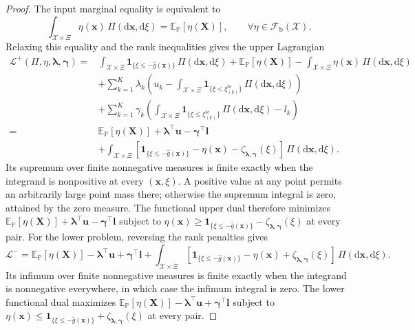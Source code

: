 \documentclass[review,11pt,3p,authoryear,nopreprintline]{elsarticle}
\begin{document}
\begin{proof}
  The input marginal equality is equivalent to
  \[
    \int_{\mathcal X\times\Xi}\eta(\bm x)\,\Pi(\mathrm d\bm x,\mathrm d\xi)
      =\mathbb E_{\mathbb P}\left[\eta(\bm X)\right],
    \qquad\forall\eta\in\mathcal F_{\mathrm b}(\mathcal X).
  \]
  Relaxing this equality and the rank inequalities gives the upper Lagrangian \citep[Section~5.1]{B.V04}
  \[
    \begin{aligned}
      \mathcal L^+(\Pi,\eta,\bm\lambda,\bm\gamma)
      ={}&\int_{\mathcal X\times\Xi}\mathbf1_{\{\xi\le-\hat g(\bm x)\}}\,\Pi(\mathrm d\bm x,\mathrm d\xi)
        +\mathbb E_{\mathbb P}\left[\eta(\bm X)\right]
        -\int_{\mathcal X\times\Xi}\eta(\bm x)\,\Pi(\mathrm d\bm x,\mathrm d\xi)\\
      &+\sum_{k=1}^{K}\lambda_k\left(u_k-\int_{\mathcal X\times\Xi}
          \mathbf1_{\{\xi<\xi_{(k)}^{\mathrm{te}}\}}\,\Pi(\mathrm d\bm x,\mathrm d\xi)\right)\\
      &+\sum_{k=1}^{K}\gamma_k\left(\int_{\mathcal X\times\Xi}
          \mathbf1_{\{\xi\le\xi_{(k)}^{\mathrm{te}}\}}\,\Pi(\mathrm d\bm x,\mathrm d\xi)-l_k\right)\\
      ={}&\mathbb E_{\mathbb P}\left[\eta(\bm X)\right]
        +\bm\lambda^\top\bm u-\bm\gamma^\top\bm l\\
      &+\int_{\mathcal X\times\Xi}\left[
          \mathbf1_{\{\xi\le-\hat g(\bm x)\}}-\eta(\bm x)-\zeta_{\bm\lambda,\bm\gamma}(\xi)
        \right]\,\Pi(\mathrm d\bm x,\mathrm d\xi).
    \end{aligned}
  \]
  Its supremum over finite nonnegative measures is finite exactly when the integrand is nonpositive at every $(\bm x,\xi)$. A positive value at any point permits an arbitrarily large point mass there; otherwise the supremum integral is zero, attained by the zero measure. The functional upper dual therefore minimizes $\mathbb E_{\mathbb P}[\eta(\bm X)]+\bm\lambda^\top\bm u-\bm\gamma^\top\bm l$ subject to $\eta(\bm x)\ge\mathbf1_{\{\xi\le-\hat g(\bm x)\}}-\zeta_{\bm\lambda,\bm\gamma}(\xi)$ at every pair. For the lower problem, reversing the rank penalties gives
  \[
    \mathcal L^-
      =\mathbb E_{\mathbb P}\left[\eta(\bm X)\right]
        -\bm\lambda^\top\bm u+\bm\gamma^\top\bm l
        +\int_{\mathcal X\times\Xi}\left[
          \mathbf1_{\{\xi\le-\hat g(\bm x)\}}-\eta(\bm x)+\zeta_{\bm\lambda,\bm\gamma}(\xi)
        \right]\,\Pi(\mathrm d\bm x,\mathrm d\xi).
  \]
  Its infimum over finite nonnegative measures is finite exactly when the integrand is nonnegative everywhere, in which case the infimum integral is zero. The lower functional dual maximizes $\mathbb E_{\mathbb P}[\eta(\bm X)]-\bm\lambda^\top\bm u+\bm\gamma^\top\bm l$ subject to $\eta(\bm x)\le\mathbf1_{\{\xi\le-\hat g(\bm x)\}}+\zeta_{\bm\lambda,\bm\gamma}(\xi)$ at every pair.


\end{proof}
\end{document}
